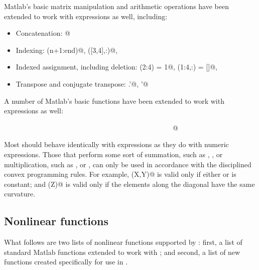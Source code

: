 \documentclass[12pt]{article}
\begin{document}
Matlab's basic matrix manipulation and arithmetic
operations have been extended to work with
\cvx expressions as well, including:
\begin{itemize}
\item Concatenation: \verb@[ A, B ; C, D ]@
\item Indexing: \verb@x(n+1:end)@, \verb@X([3,4],:)@, \etc
\item Indexed assignment, including deletion: \verb@y(2:4) = 1@, \verb@Z(1:4,:) = []@, \etc
\item Transpose and conjugate transpose: \verb@Z.'@, \verb@y'@
\end{itemize}
A number of Matlab's basic functions have been extended to work with \verb@cvx@
expressions as well:
\begin{center}
\verb@conj@\ \ \ \verb@conv@\ \ \ \verb@cumsum@\ \ \ \verb@diag@\ \ \ \verb@dot@\ \ \ 
\verb@find@\ \ \ \verb@fliplr@\ \ \ \verb@flipud@\ \ \ \verb@flipdim@\ \ \
\verb@horzcat@\ \ \ \verb@hankel@\ \ \ \verb@ipermute@\ \ \ \verb@kron@\ \ \
\verb@permute@\ \ \ \verb@repmat@\ \ \ \verb@reshape@\ \ \ @\ \ \
\verb@sparse@\ \ \ \verb@sum@\ \ \ \verb@trace@\ \ \ \verb@tril@\ \ \
\verb@triu@\ \ \ \verb@toeplitz@\ \ \ \verb@vertcat@
\end{center}
Most should behave identically with \cvx expressions as they do with numeric expressions.
Those that perform some sort of summation, such as \verb@cumsum@, \verb@sum@, or
multiplication, such as \verb@conv@, \verb@dot@ or \verb@kron@, can
only be used in accordance with the disciplined convex programming rules. For example,
\verb@kron(X,Y)@ is valid only if either \verb@X@ or \verb@Y@ is constant; and 
\verb@trace(Z)@ is valid only if the elements along the diagonal have the same curvature.

\subsection{Nonlinear functions}
\label{sec:nonl}

What follows are two lists of nonlinear functions supported by \cvx: first, a
list of standard Matlab functions extended to work with \cvx; and second, a list
of new functions created specifically for use in \cvx.
\end{document}
